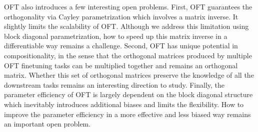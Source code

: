 OFT also introduces a few interesting open problems. First, OFT guarantees the orthogonality via Cayley parametrization which involves a matrix inverse. It slightly limits the scalability of OFT. Although we address this limitation using block diagonal parametrization, how to speed up this matrix inverse in a differentiable way remains a challenge. Second, OFT has unique potential in compositionality, in the sense that the orthogonal matrices produced by multiple OFT finetuning tasks can be multiplied together and remains an orthogonal matrix. Whether this set of orthogonal matrices preserve the knowledge of all the downstream tasks remains an interesting direction to study. Finally, the parameter efficiency of OFT is largely dependent on the block diagonal structure which inevitably introduces additional biases and limits the flexibility. How to improve the parameter efficiency in a more effective and less biased way remains an important open problem.

\newpage

